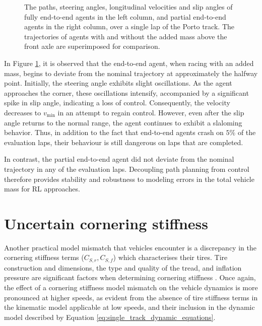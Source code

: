 \begin{figure}[htb!]
    \centering
    
    \caption[Trajectories of agents racing with and without an accounted for mass placed above the front axle]{The paths, steering angles, longitudinal velocities and slip angles of fully end-to-end agents in the left column, and partial end-to-end agents in the right column, over a single lap of the Porto track. The trajectories of agents with and without the added mass above the front axle are superimposed for comparison.}
    \label{fig:unknown_mass_trajs_2}
\end{figure}

In Figure \ref{fig:unknown_mass_trajs_2}, it is observed that the end-to-end agent, when racing with an added mass, begins to deviate from the nominal trajectory at approximately the halfway point. 
Initially, the steering angle exhibits slight oscillations. 
As the agent approaches the corner, these oscillations intensify, accompanied by a significant spike in slip angle, indicating a loss of control. 
Consequently, the velocity decreases to $v_{\text{min}}$ in an attempt to regain control. 
However, even after the slip angle returns to the normal range, the agent continues to exhibit a slaloming behavior.
Thus, in addition to the fact that end-to-end agents crash on $5\%$ of the evaluation laps, their behaviour is still dangerous on laps that are completed.

In contrast, the partial end-to-end agent did not deviate from the nominal trajectory in any of the evaluation laps.
Decoupling path planning from control therefore provides stability and robustness to modeling errors in the total vehicle mass for RL approaches.


\section{Uncertain cornering stiffness}

Another practical model mismatch that vehicles encounter is a discrepancy in the cornering stiffness terms ($C_{S,r}, C_{S,f}$) which characterises their tires.
Tire construction and dimensions, the type and quality of the tread, and inflation pressure are significant factors when determining cornering stiffness \cite{Vorotovic2013}.
Once again, the effect of a cornering stiffness model mismatch on the vehicle dynamics is more pronounced at higher speeds, as evident from the absence of tire stiffness terms in the kinematic model applicable at low speeds, and their inclusion in the dynamic model described by Equation \ref{eq:single_track_dynamic_equations}.



